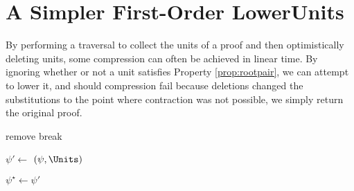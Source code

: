 
\section{A Simpler First-Order LowerUnits}
\label{sec:SimpleFOLU}

%

By performing a traversal to collect the units of a proof and then optimistically deleting units, some compression can often be achieved in linear time. By ignoring whether or not a unit satisfies Property \ref{prop:rootpair}, we can attempt to lower it, and should compression fail because deletions changed the substitutions to the point where contraction was not possible, we simply return the original proof. 

\begin{algorithm}[bt]
  \SetAlgoVlined
  \SetAlgoShortEnd
{}
  \BlankLine


   {remove}
   {break}

  \BlankLine

  \BlankLine

    $\psi' \leftarrow $ $(\psi,\Units)$ \;
    \BlankLine

    

    $\psi^{\star} \leftarrow \psi'$ \;
  
    

  \caption{\SFOLowerUnits}
  \label{algo:simpleFOLU}
\end{algorithm}

